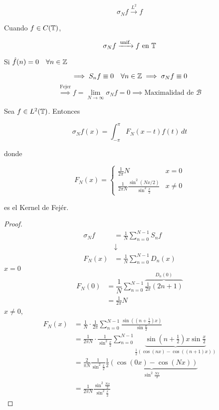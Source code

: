 \begin{ftheorem}[Fejér]
    \[\sigma_N f\xrightarrow{L^2} f\]

    Cuando $f\in C(\mathbb{T})$, 

    \[\sigma_N f\xrightarrow{\text{unif.}} f\text{ en }\mathbb{T}\]
\end{ftheorem}

Si $\hat f(n)=0\quad\forall n\in\mathbb{Z}$

\[\implies S_n f \equiv 0\quad \forall n\in\mathbb{Z}\implies \sigma_N f\equiv 0\]
\[\overset{\text{Fejer}}{\implies} f=\lim_{N\to\infty}\sigma_N f=0\implies \text{Maximalidad de }\mathcal{B}\]

\begin{fproposition}
    Sea $f\in L^2(\mathbb{T})$. Entonces 

    \[\sigma_N f(x)=\int_{-\pi}^\pi F_N(x-t)f(t)\,dt\]

    donde 

    \[F_N(x)=\begin{cases}
        \frac{1}{2\pi}N & x=0\\
        \frac{1}{2\pi N} \frac{\sin^2(Nx/2)}{\sin^2 \frac{x}{2}}& x\neq 0
    \end{cases}\]

    es el Kernel de Fejér.
\end{fproposition}

\begin{proof}
    \begin{align*}
        \sigma_N f&=\frac{1}{N} \sum_{n=0}^{N-1} S_n f\\
        &\downarrow\\
        F_N(x)&=\frac{1}{N}\sum_{n=0}^{N-1} D_n(x)
    \end{align*}
    $x=0$
    \begin{align*}
        F_N(0)&=\dfrac{1}{N}\displaystyle\sum_{n=0}^{N-1} \overbrace{\frac{1}{2\pi} (2n+1)}^{D_n(0)}\\
        &=\frac{1}{2\pi} N
    \end{align*}
    $x\neq 0$,
    \begin{align*}
        F_N(x)&=\frac{1}{N}\cdot \frac{1}{2\pi} \sum_{n=0}^{N-1} \frac{\sin ((n+\frac{1}{2})x)}{\sin\frac{x}{2}}\\
        &=\frac{1}{2\pi N}\cdot \frac{1}{\sin^2 \frac{x}{2}}\sum_{n=0}^{N-1} \underbrace{\sin(n+\frac{1}{2})x\sin \frac{x}{2}}_{\frac{1}{2}\left(\cos(nx)-\cos((n+1)x)\right)}\\
        &=\frac{2}{\pi N}\frac{1}{\sin^2 \frac{x}{2}}\underbrace{\frac{1}{2}(\cos(0x)-\cos(Nx))}_{\sin^2 \frac{Nx}{2}}\\
        &=\frac{1}{2\pi N}\frac{\sin^2 \frac{Nx}{2}}{\sin^2\frac{x}{2}}
    \end{align*}
\end{proof}

